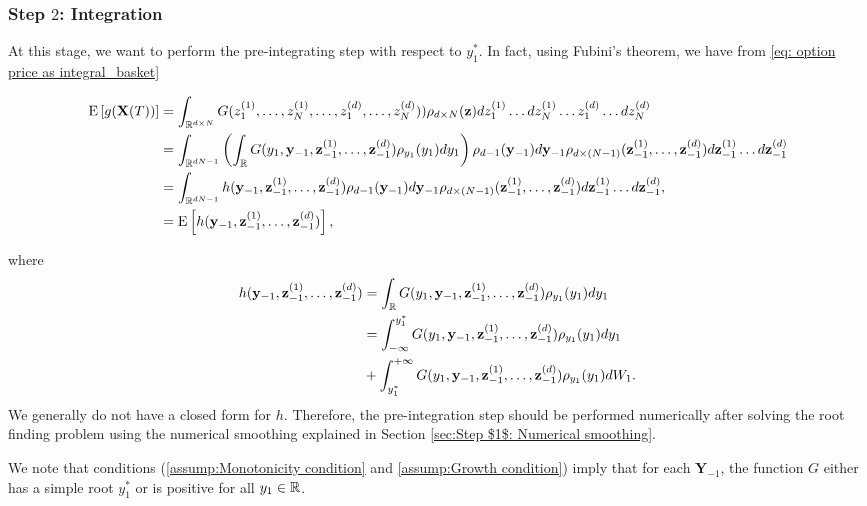 \subsubsection{Step $2$: Integration}\label{sec:Step $2$: Integration}
At this stage, we want to perform the pre-integrating step with respect to  $y^\ast_1$. In fact, using Fubini's theorem, we have from \eqref{eq: option price as integral_basket}
\begin{small}
\begin{align}\label{eq: pre_integration_step_wrt_y1_basket}
	\mathrm{E}\left[g(\mathbf{X}(T))\right]&=\int_{\mathbb{R}^{d \times N}} G(z_1^{(1)}, \dots, z_N^{(1)}, \dots, z_1^{(d)},\dots,z^{(d)}_N)) \rho_{d \times N}(\mathbf{z}) dz_1^{(1)} \dots dz_N^{(1)} \dots z_1^{(d)} \dots dz^{(d)}_N \nonumber\\ 
	&=\int_{\mathbb{R}^{dN-1}} \left(\int_{\mathbb{R}} G(y_1,\mathbf{y}_{-1},\mathbf{z}^{(1)}_{-1},\dots,\mathbf{z}^{(d)}_{-1} ) \rho_{y_1}(y_1) dy_1 \right)\rho_{d-1}(\mathbf{y}_{-1}) d\mathbf{y}_{-1} \rho_{d \times(N-1)}(\mathbf{z}_{-1}^{(1)},\dots,\mathbf{z}_{-1}^{(d)}) d\mathbf{z}_{-1}^{(1)}\dots d\mathbf{z}_{-1}^{(d)} \nonumber\\	
	&=\int_{\mathbb{R}^{dN-1}} h(\mathbf{y}_{-1},\mathbf{z}^{(1)}_{-1},\dots,\mathbf{z}^{(d)}_{-1} )\rho_{d-1}(\mathbf{y}_{-1}) d\mathbf{y}_{-1}  \rho_{d\times (N-1)}(\mathbf{z}_{-1}^{(1)},\dots,\mathbf{z}_{-1}^{(d)}) d\mathbf{z}^{(1)}_{-1} \dots d\mathbf{z}^{(d)}_{-1}, \\ \nonumber
	&=\mathrm{E}\left[h(\mathbf{y}_{-1}, \mathbf{z}^{(1)}_{-1},\dots,\mathbf{z}^{(d)}_{-1} )\right] ,
\end{align}
\end{small}
where
\begin{align}\label{eq:smooth_function_after_pre_integration}
 h(\mathbf{y}_{-1},\mathbf{z}^{(1)}_{-1},\dots,\mathbf{z}^{(d)}_{-1})&=\int_{\mathbb{R}} G(y_1,\mathbf{y}_{-1},\mathbf{z}^{(1)}_{-1},\dots,\mathbf{z}^{(d)}_{-1} ) \rho_{y_1}(y_1) dy_1 \nonumber\\
 &= \int_{-\infty}^{y^\ast_1} G(y_1,\mathbf{y}_{-1},\mathbf{z}^{(1)}_{-1},\dots,\mathbf{z}^{(d)}_{-1} ) \rho_{y_1}(y_1) dy_1\nonumber\\
 &+ \int_{y_1^\ast}^{+\infty} G(y_1,\mathbf{y}_{-1},\mathbf{z}^{(1)}_{-1},\dots,\mathbf{z}^{(d)}_{-1} ) \rho_{y_1}(y_1) dW_1 .
\end{align}
We generally do not have a closed form for $h$. Therefore, the pre-integration step should be performed numerically after solving the root finding problem using the numerical smoothing explained in Section \ref{sec:Step $1$: Numerical smoothing}.


\begin{remark}
We note that  conditions (\eqref{assump:Monotonicity condition} and \eqref{assump:Growth condition}) imply that for each $\mathbf{Y}_{-1}$, the function $G$ either has a simple  root $y_1^\ast$ or is positive for all $y_1 \in \mathbb{R}$.
\end{remark}
